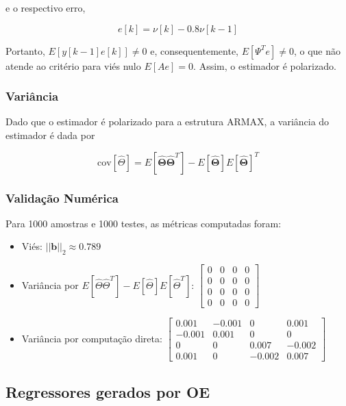 \documentclass{article}
\begin{document}
e o respectivo erro,

\begin{equation*}
e[k] = \nu[k] - 0.8\nu[k - 1]
\end{equation*}

Portanto, $E[y[k - 1]e[k]] \neq 0$ e, consequentemente, $E[\Psi^Te] \neq 0$, o que não atende ao critério para viés nulo $E[Ae] = 0$. Assim, o estimador é polarizado.

\subsubsection*{Variância}

Dado que o estimador é polarizado para a estrutura ARMAX, a variância do estimador é dada por

\begin{equation*}
\text{cov}[\hat{\Theta}] = E[\boldsymbol{\hat{\Theta}}\boldsymbol{\hat{\Theta}}^T] - E[\boldsymbol{\hat{\Theta}}]E[\boldsymbol{\hat{\Theta}}]^T
\end{equation*}

\subsubsection*{Validação Numérica}

Para 1000 amostras e 1000 testes, as métricas computadas foram:

\begin{itemize}
    \item Viés: $||\boldsymbol{b}||_2 \approx 0.789$
    \item Variância por $E[\hat{\Theta}\hat{\Theta}^T] - E[\hat{\Theta}]E[\hat{\Theta}^T]$: $\begin{bmatrix} 0 & 0 & 0 & 0 \\ 0 & 0 & 0 & 0 \\ 0 & 0 & 0 & 0 \\ 0 & 0 & 0 & 0 \end{bmatrix}$
    \item Variância por computação direta: $\begin{bmatrix} 0.001 & -0.001 & 0 & 0.001 \\ -0.001 & 0.001 & 0 & 0 \\ 0 & 0 & 0.007 & -0.002 \\ 0.001 & 0 & -0.002 & 0.007 \end{bmatrix}$
\end{itemize}

\subsection*{Regressores gerados por OE}
\end{document}
